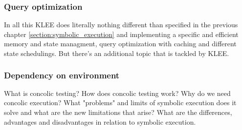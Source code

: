 \subsubsection{Query optimization}
In all this KLEE does literally nothing different than specified in the previous chapter \ref{section:symbolic_execution} and implementing a specific and efficient memory and state managment, query optimization with caching and different state schedulings. But there's an additional topic that is tackled by KLEE.
\subsubsection{Dependency on environment}
 


What is concolic testing? How does concolic testing work? Why do we need concolic execution? What "problems" and limits of symbolic execution does it solve and what are the new limitations that arise?
What are the differences, advantages and disadvantages in relation to symbolic execution.
\cite{Cadar:2006:EAG:1180405.1180445}
\cite{Cadar:2008:KUA:1855741.1855756}
\cite{Cadar:2013:SES:2408776.2408795}
\cite{Godefroid:2005:DDA:1064978.1065036}
\cite{Godefroid:2012:SWF:2090147.2094081}